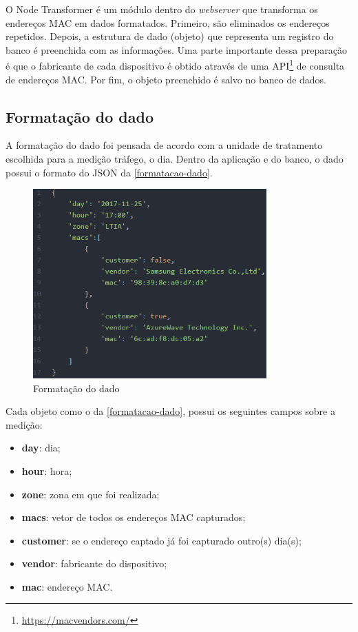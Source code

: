 O Node Transformer é um módulo dentro do \emph{webserver}
que transforma os endereços MAC em dados formatados.
Primeiro, são eliminados os endereços repetidos. Depois, a estrutura de dado (objeto)
que representa um registro do banco é preenchida com as informações. Uma parte importante dessa preparação
é que o fabricante de cada dispositivo é obtido através de uma API\footnote{\url{https://macvendors.com/}} de consulta de endereços MAC. Por fim,
o objeto preenchido é salvo no banco de dados.

\subsection{Formatação do dado}
A formatação do dado foi pensada de acordo com a unidade de tratamento escolhida para a medição tráfego, o dia.
Dentro da aplicação e do banco, o dado possui o formato do JSON da \autoref{formatacao-dado}.

\begin{figure}[!h]
  \caption{\label{formatacao-dado}Formatação do dado}
  \begin{center}
    \includegraphics[width=0.8\textwidth]{img/formato-dado.png}
  \end{center}
\end{figure}

Cada objeto como o da \autoref{formatacao-dado}, possui os seguintes campos sobre a medição:
\begin{itemize}
    \item \textbf{day}: dia;
    \item \textbf{hour}: hora;
    \item \textbf{zone}: zona em que foi realizada;
    \item \textbf{macs}: vetor de todos os endereços MAC capturados;
    \item \textbf{customer}: se o endereço captado já foi capturado outro(s) dia(s);
    \item \textbf{vendor}: fabricante do dispositivo;
    \item \textbf{mac}: endereço MAC.
\end{itemize}

